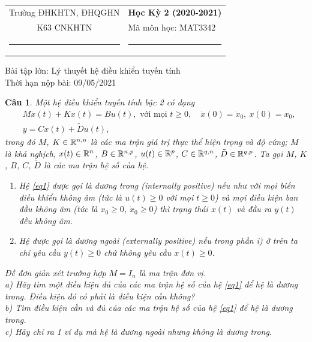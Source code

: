 \documentclass[11pt]{article}
\newtheorem{bt}{Câu}
\begin{document}
\begin{tabular*}
{\linewidth}{c>{\centering\hspace{0pt}} p{}}
Trường ĐHKHTN, ĐHQGHN & {\bf Học Kỳ 2 (2020-2021)}
\tabularnewline
K63 CNKHTN & Mã môn học: MAT3342
\tabularnewline
\rule{1in}{1pt}  \small  & \rule{2in}{1pt} %
\tabularnewline

\end{tabular*}
%

\begin{center}
Bài tập lớn: Lý thuyết hệ điều khiển tuyến tính \\ Thời hạn nộp bài: 09/05/2021
\end{center}

\begin{bt}
	Một hệ điều khiển tuyến tính bậc 2 có dạng 
	\begin{align}\label{eq1}
		& M \ddot{x}(t) + K x(t) = B u(t), \mbox{ với mọi } t\geq 0, \quad \dot{x}(0)=\dot{x}_0, \ x(0) = x_0, \\  
		& y = C x(t) + \tilde{D} u(t),
	\end{align}
	trong đó $M$, $K \in \mathbb{R}^{n,n}$ là các ma trận giá trị thực thể hiện trọng và độ cứng; $M$ là khả nghịch, $x(t)\in \mathbb{R}^n$, $B\in \mathbb{R}^{n,p}$, $u(t) \in \mathbb{R}^p$, $C \in \mathbb{R}^{q,n}$, $\tilde{D}\in \mathbb{R}^{q,p}$. Ta gọi $M$, $K$, $B$, $C$, $\tilde{D}$ là các ma trận hệ số của hệ.
	\begin{enumerate}
		\item[i)] Hệ \eqref{eq1} được gọi là \emph{dương trong (internally positive)} nếu như với mọi biến điều khiển không âm (tức là $u(t) \geq 0$ với mọi $t\geq 0$) và mọi điều kiện ban đầu không âm (tức là $x_0\geq 0$, $\dot{x}_0\geq 0$) thì trạng thái $x(t)$ và đầu ra $y(t)$ đều không âm.
		\item[ii)] Hệ được gọi là \emph{dương ngoài (externally positive)} nếu trong phần i) ở trên ta chỉ yêu cầu $y(t)\geq 0$ chứ không yêu cầu $x(t) \geq 0$.
	\end{enumerate}
	Đề đơn giản xét trường hợp $M=I_n$ là ma trận đơn vị. \\
	a) Hãy tìm một điều kiện đủ của các ma trận hệ số của hệ \eqref{eq1} để hệ là dương trong. Điều kiện đó có phải là điều kiện cần không? \\
	b) Tìm điều kiện cần và đủ của các ma trận hệ số của hệ \eqref{eq1} để hệ là dương trong. \\
	c) Hãy chỉ ra 1 ví dụ mà hệ là dương ngoài nhưng không là dương trong. \\
\end{bt}
\end{document}
